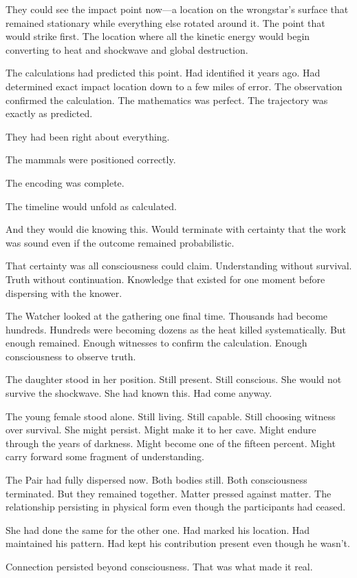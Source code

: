 They could see the impact point now—a location on the wrongstar's surface that remained stationary while everything else rotated around it. The point that would strike first. The location where all the kinetic energy would begin converting to heat and shockwave and global destruction.

The calculations had predicted this point. Had identified it years ago. Had determined exact impact location down to a few miles of error. The observation confirmed the calculation. The mathematics was perfect. The trajectory was exactly as predicted.

They had been right about everything.

The mammals were positioned correctly.

The encoding was complete.

The timeline would unfold as calculated.

And they would die knowing this. Would terminate with certainty that the work was sound even if the outcome remained probabilistic.

That certainty was all consciousness could claim. Understanding without survival. Truth without continuation. Knowledge that existed for one moment before dispersing with the knower.

The Watcher looked at the gathering one final time. Thousands had become hundreds. Hundreds were becoming dozens as the heat killed systematically. But enough remained. Enough witnesses to confirm the calculation. Enough consciousness to observe truth.

The daughter stood in her position. Still present. Still conscious. She would not survive the shockwave. She had known this. Had come anyway.

The young female stood alone. Still living. Still capable. Still choosing witness over survival. She might persist. Might make it to her cave. Might endure through the years of darkness. Might become one of the fifteen percent. Might carry forward some fragment of understanding.

The Pair had fully dispersed now. Both bodies still. Both consciousness terminated. But they remained together. Matter pressed against matter. The relationship persisting in physical form even though the participants had ceased.

She had done the same for the other one. Had marked his location. Had maintained his pattern. Had kept his contribution present even though he wasn't.

Connection persisted beyond consciousness. That was what made it real.

